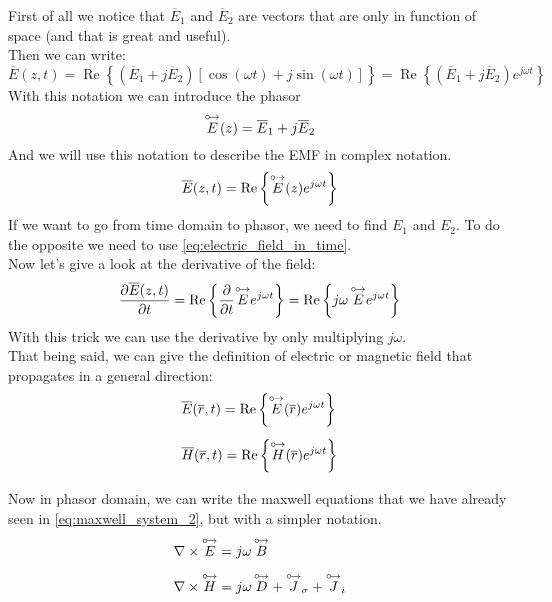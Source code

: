 First of all we notice that $\overline{E}_1$ and $\overline{E}_2$ are vectors that are only in function of space (and that is great and useful).\\
Then we can write:
\begin{equation}
    \overline{E}(z,t)=\operatorname{Re}\left\{(\overline{E}_1+j\overline{E}_2)[\cos(\omega t)+j \sin(\omega t)]\right\}=\operatorname{Re}\left\{(\overline{E}_1+j\overline{E}_2)e^{j\omega t}\right\}
\end{equation}
With this notation we can introduce the phasor 
\begin{equation}
\overset{\mathbin {{\circ \mkern-2.5mu\rightarrow}}}{E}(z)=\overline{E}_1+j\overline{E}_2
\end{equation}
And we will use this notation to describe the EMF in complex notation.
\begin{equation}\label{eq:electric_field_in_time}
    \overline{E}(z,t)=\operatorname{Re}\left\{\overset{\mathbin {{\circ \mkern-2.5mu\rightarrow}}}{E}(z)e^{j\omega t}\right\}
\end{equation}
If we want to go from time domain to phasor, we need to find $E_1$ and $E_2$. To do the opposite we need to use \cref{eq:electric_field_in_time}.\\
Now let's give a look at the derivative of the field:
\begin{equation}
    \frac{\partial\overline{E}(z,t)}{\partial t}=\operatorname{Re}\left\{\frac{\partial}{\partial t}\overset{\mathbin {{\circ \mkern-2.5mu\rightarrow}}}{E}e^{j\omega t}\right\}=\operatorname{Re}\left\{j\omega\,\overset{\mathbin {{\circ \mkern-2.5mu\rightarrow}}}{E}e^{j\omega t}\right\}
\end{equation}
With this trick we can use the derivative by only multiplying $j\omega$.\\
That being said, we can give the definition of electric or magnetic field that propagates in a general direction:
\begin{align}
    \begin{split}
        &\overline{E}(\overline{r},t)=\operatorname{Re}\left\{\overset{\mathbin {{\circ \mkern-2.5mu\rightarrow}}}{E}(\overline{r})e^{j\omega t}\right\}\\[5pt]
        &\overline{H}(\overline{r},t)=\operatorname{Re}\left\{\overset{\mathbin {{\circ \mkern-2.5mu\rightarrow}}}{H}(\overline{r})e^{j\omega t}\right\}\\[5pt]
    \end{split}
\end{align}
Now in phasor domain, we can write the maxwell equations that we have already seen in \cref{eq:maxwell_system_2}, but with a simpler notation.
\begin{align}\label{eq:maxwell_equation_in_phasor}
    \begin{split}
        &\nabla\times\overset{\mathbin {{\circ \mkern-2.5mu\rightarrow}}}{E}=j\omega \,\overset{\mathbin {{\circ \mkern-2.5mu\rightarrow}}}{B}\\[5pt]
        &\nabla\times\overset{\mathbin {{\circ \mkern-2.5mu\rightarrow}}}{H}=j\omega \,\overset{\mathbin {{\circ \mkern-2.5mu\rightarrow}}}{D}+\overset{\mathbin {{\circ \mkern-2.5mu\rightarrow}}}{J}_\sigma+\overset{\mathbin {{\circ \mkern-2.5mu\rightarrow}}}{J}_i\\[5pt]
    \end{split}
\end{align}
